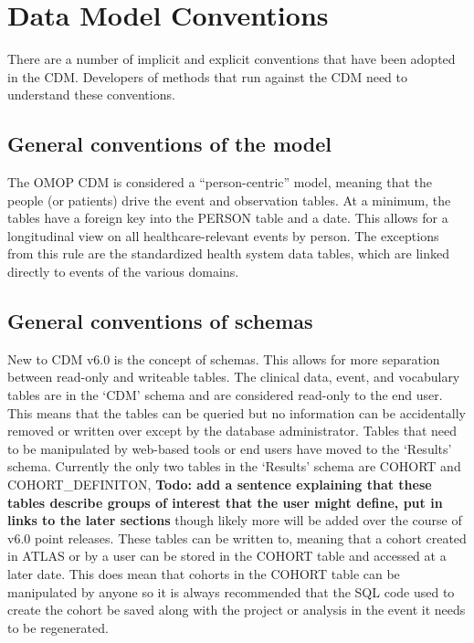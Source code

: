 \documentclass[11pt]{book}
\begin{document}
\section{Data Model Conventions}\label{data-model-conventions}

There are a number of implicit and explicit conventions that have been
adopted in the CDM. Developers of methods that run against the CDM need
to understand these conventions.

\subsection{General conventions of the model}\label{model-conv}

The OMOP CDM is considered a ``person-centric'' model, meaning that the
people (or patients) drive the event and observation tables. At a
minimum, the tables have a foreign key into the PERSON table and a date.
This allows for a longitudinal view on all healthcare-relevant events by
person. The exceptions from this rule are the standardized health system
data tables, which are linked directly to events of the various domains.

\subsection{General conventions of
schemas}\label{general-conventions-of-schemas}

New to CDM v6.0 is the concept of schemas. This allows for more
separation between read-only and writeable tables. The clinical data,
event, and vocabulary tables are in the `CDM' schema and are considered
read-only to the end user. This means that the tables can be queried but
no information can be accidentally removed or written over except by the
database administrator. Tables that need to be manipulated by web-based
tools or end users have moved to the `Results' schema. Currently the
only two tables in the `Results' schema are COHORT and
COHORT\_DEFINITON, \textbf{Todo: add a sentence explaining that these
tables describe groups of interest that the user might define, put in
links to the later sections} though likely more will be added over the
course of v6.0 point releases. These tables can be written to, meaning
that a cohort created in ATLAS or by a user can be stored in the COHORT
table and accessed at a later date. This does mean that cohorts in the
COHORT table can be manipulated by anyone so it is always recommended
that the SQL code used to create the cohort be saved along with the
project or analysis in the event it needs to be regenerated.
\end{document}
